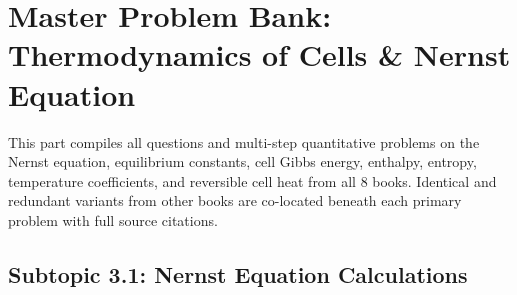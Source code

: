 \chapter{Master Problem Bank: Thermodynamics of Cells \& Nernst Equation}
\label{chap:qb_thermodynamics}

\begin{tcolorbox}[enhanced,colback=subtleamber,colframe=accentamber,arc=2mm,boxrule=1pt,
    title=\textbf{\large Part III Organization: Nernst Equation \& Cell Thermodynamics}]
This part compiles all questions and multi-step quantitative problems on the Nernst equation, equilibrium constants, cell Gibbs energy, enthalpy, entropy, temperature coefficients, and reversible cell heat from all 8 books. Identical and redundant variants from other books are co-located beneath each primary problem with full source citations.
\end{tcolorbox}

\section{Subtopic 3.1: Nernst Equation Calculations}

